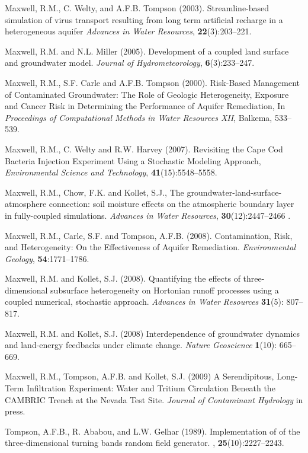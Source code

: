 \begin{thebibliography}{99}
 Maxwell, R.M., C. Welty, and A.F.B. Tompson (2003).
Streamline-based simulation of virus transport resulting from long term
artificial recharge in a heterogeneous aquifer {\em Advances in Water
Resources}, {\bf 22}(3):203--221.

Maxwell, R.M. and N.L. Miller (2005). Development of a coupled land surface and groundwater model.  {\em Journal of Hydrometeorology}, {\bf 6}(3):233--247.

Maxwell, R.M., S.F. Carle and A.F.B. Tompson (2000). Risk-Based Management of Contaminated Groundwater: The Role of Geologic Heterogeneity, Exposure and Cancer Risk in Determining the Performance of Aquifer Remediation, In {\em Proceedings of Computational Methods in Water Resources XII}, Balkema, 533--539.

 Maxwell, R.M., C. Welty and R.W. Harvey (2007). Revisiting the Cape Cod Bacteria Injection Experiment Using a Stochastic Modeling Approach, {\em Environmental Science and Technology}, { \bf 41}(15):5548--5558.

Maxwell, R.M., Chow, F.K. and Kollet, S.J., The groundwater-land-surface-atmosphere connection: soil moisture effects on the atmospheric boundary layer in fully-coupled simulations. {\em Advances in Water Resources}, {\bf 30}(12):2447--2466 .

Maxwell, R.M., Carle, S.F. and Tompson, A.F.B. (2008).
Contamination, Risk, and Heterogeneity: On the Effectiveness of Aquifer Remediation. {\em Environmental Geology}, {\bf 54}:1771--1786.

Maxwell, R.M. and Kollet, S.J. (2008). Quantifying the effects of three-dimensional subsurface heterogeneity on Hortonian runoff processes using a coupled numerical, stochastic approach. {\em Advances in Water Resources} {\bf 31}(5): 807--817. 

Maxwell, R.M. and Kollet, S.J. (2008) Interdependence of groundwater dynamics and land-energy feedbacks under climate change. {\em Nature Geoscience} {\bf 1}(10): 665--669.

Maxwell, R.M., Tompson, A.F.B. and Kollet, S.J. (2009) A Serendipitous, Long-Term Infiltration Experiment: Water and Tritium Circulation Beneath the CAMBRIC Trench at the Nevada Test Site. {\em Journal of Contaminant Hydrology} in press.

Tompson, A.F.B., R. Ababou, and L.W. Gelhar (1989).
\newblock Implementation of of the three-dimensional turning bands random field
  generator.
, {\bf 25}(10):2227--2243.


\end{thebibliography}
